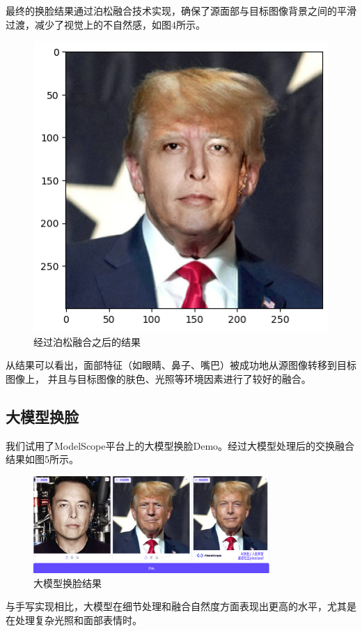 最终的换脸结果通过泊松融合技术实现，确保了源面部与目标图像背景之间的平滑过渡，减少了视觉上的不自然感，如图4所示。
\begin{figure}
	\centering
	\includegraphics[width=0.7\linewidth]{image/seamlessClone}
	\caption{经过泊松融合之后的结果}
	\label{图4：}
\end{figure}


从结果可以看出，面部特征（如眼睛、鼻子、嘴巴）被成功地从源图像转移到目标图像上，
并且与目标图像的肤色、光照等环境因素进行了较好的融合。

\subsection{大模型换脸}
我们试用了ModelScope平台上的大模型换脸Demo。经过大模型处理后的交换融合结果如图5所示。
\begin{figure}[h!]
    \centering
    \includegraphics[width=0.8\textwidth]{image/LM_swap.png}
    \caption{大模型换脸结果}
    \label{图5：}
\end{figure}
与手写实现相比，大模型在细节处理和融合自然度方面表现出更高的水平，尤其是在处理复杂光照和面部表情时。
